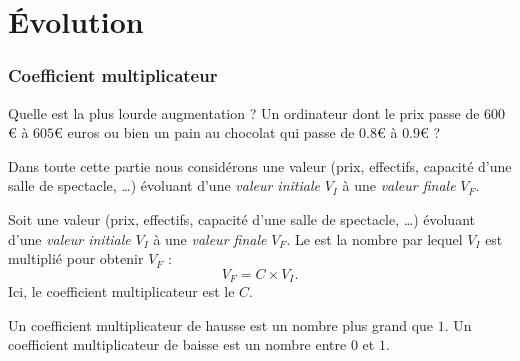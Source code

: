 
\section{Évolution}

\subsubsection{Coefficient multiplicateur}

Quelle est la plus lourde augmentation ? Un ordinateur dont le prix passe de \( 600\)€ à \( 605\)€ euros ou bien un pain au chocolat qui passe de \( 0.8\)€ à \( 0.9\)€ ?

Dans toute cette partie nous considérons une valeur (prix, effectifs, capacité d'une salle de spectacle, \ldots) évoluant d'une \emph{valeur initiale} \( V_I\) à une \emph{valeur finale} \( V_F\).

\begin{definition}
    Soit une valeur (prix, effectifs, capacité d'une salle de spectacle, \ldots) évoluant d'une \emph{valeur initiale} \( V_I\) à une \emph{valeur finale} \( V_F\). Le  est la nombre par lequel \( V_I\) est multiplié pour obtenir \( V_F\) :
    \begin{equation}
        V_F=C\times V_I.
    \end{equation}
    Ici, le coefficient multiplicateur est le \( C\).
\end{definition}

Un coefficient multiplicateur de hausse est un nombre plus grand que \( 1\). Un coefficient multiplicateur de baisse est un nombre entre \( 0\) et \( 1\).

